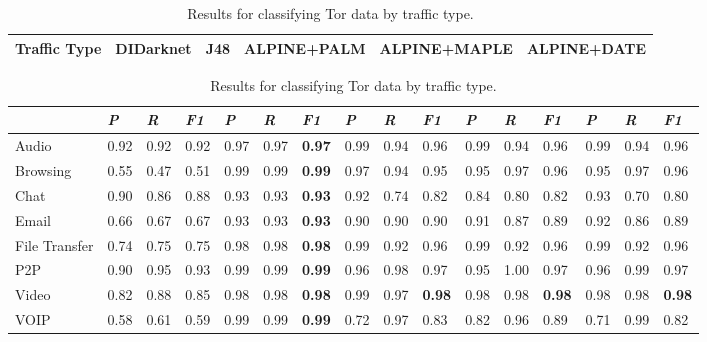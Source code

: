 \begin{table}[h!]
\centering
\begin{tabular} {|p{2cm}|p{2.3cm}|p{2.3cm}|p{2.3cm}|p{2.4cm}|p{2.3cm}|}
\hline
\textbf{Traffic Type} & DIDarknet & J48 & ALPINE+PALM & ALPINE+MAPLE & ALPINE+DATE \\
\hline
\end{tabular}
\begin{tabular} {|p{2cm}|p{0.5cm}p{0.5cm}p{0.5cm}|p{0.5cm}p{0.5cm}p{0.5cm}|p{0.5cm}p{0.5cm}p{0.5cm}|p{0.5cm}p{0.5cm}p{0.5cm}|p{0.5cm}p{0.5cm}p{0.5cm}|}
\hline
& \textit{P} & \textit{R} & \textit{F1} & \textit{P} & \textit{R} & \textit{F1} & \textit{P} & \textit{R} & \textit{F1} & \textit{P} & \textit{R} & %
\textit{F1} & \textit{P} & \textit{R} & \textit{F1} \\
\hline
Audio & 0.92 & 0.92 & 0.92 & 0.97 & 0.97 & \textbf{0.97} & 0.99 & 0.94 & 0.96 & 0.99 & 0.94 & 0.96 & 0.99 & 0.94 & 0.96 \\
Browsing & 0.55 & 0.47 & 0.51 & 0.99 & 0.99 & \textbf{0.99} & 0.97 & 0.94 & 0.95 & 0.95 & 0.97 & 0.96 & 0.95 & 0.97 & 0.96 \\
Chat & 0.90 & 0.86 & 0.88 & 0.93 & 0.93 & \textbf{0.93} & 0.92 & 0.74 & 0.82 & 0.84 & 0.80 & 0.82 & 0.93 & 0.70 & 0.80 \\
Email & 0.66 & 0.67 & 0.67 & 0.93 & 0.93 & \textbf{0.93} & 0.90 & 0.90 & 0.90 & 0.91 & 0.87 & 0.89 & 0.92 & 0.86 & 0.89 \\
File Transfer & 0.74 & 0.75 & 0.75 & 0.98 & 0.98 & \textbf{0.98} & 0.99 & 0.92 & 0.96 & 0.99 & 0.92 & 0.96 & 0.99 & 0.92 & 0.96 \\
P2P & 0.90 & 0.95 & 0.93 & 0.99 & 0.99 & \textbf{0.99} & 0.96 & 0.98 & 0.97 & 0.95 & 1.00 & 0.97 & 0.96 & 0.99 & 0.97 \\
Video & 0.82 & 0.88 & 0.85 & 0.98 & 0.98 & \textbf{0.98} & 0.99 & 0.97 & \textbf{0.98} & 0.98 & 0.98 & \textbf{0.98} & 0.98 & 0.98 & \textbf{0.98} \\
VOIP & 0.58 & 0.61 & 0.59 & 0.99 & 0.99 & \textbf{0.99} & 0.72 & 0.97 & 0.83 & 0.82 & 0.96 & 0.89 & 0.71 & 0.99 & 0.82 \\
\hline
\end{tabular}
\label{tab:tortrafficresults}
\caption{Results for classifying Tor data by traffic type.}
\end{table}

